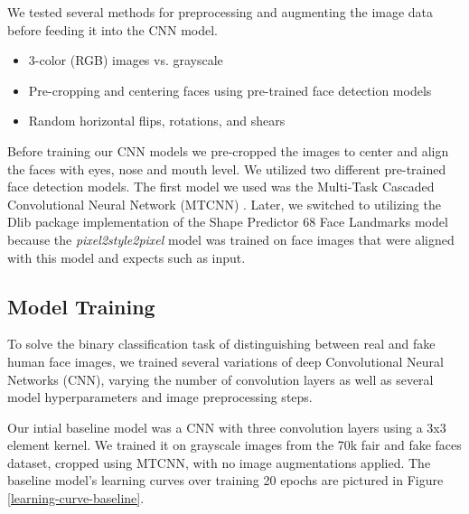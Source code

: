 \documentclass[11pt, letterpaper]{article}
\providecommand{\tightlist}{%
  \setlength{\itemsep}{0pt}\setlength{\parskip}{0pt}
}
\begin{document}
\begin{multicols}{2}
  We tested several methods for preprocessing and augmenting the image data
  before feeding it into the CNN model.

  \begin{itemize}
    \tightlist
  \item 3-color (RGB) images vs. grayscale
  \item Pre-cropping and centering faces using pre-trained face
    detection models
  \item Random horizontal flips, rotations, and shears
  \end{itemize}

  Before training our CNN models we pre-cropped the images to center
  and align the faces with eyes, nose and mouth level. We utilized two
  different pre-trained face detection models. The first model we used
  was the Multi-Task Cascaded Convolutional Neural Network (MTCNN)
  \cite{Zhang_2016}. Later, we switched to utilizing the Dlib package
  implementation of the Shape Predictor 68 Face Landmarks model
  \cite{SAGONAS20163} because the \emph{pixel2style2pixel} model was
  trained on face images that were aligned with this model and expects
  such as input.

  \subsection{Model Training}

  To solve the binary classification task of distinguishing between
  real and fake human face images, we trained several variations of
  deep Convolutional Neural Networks (CNN), varying the number of
  convolution layers as well as several model hyperparameters and
  image preprocessing steps.

  Our intial baseline model was a CNN with three convolution layers
  using a 3x3 element kernel. We trained it on grayscale images from
  the 70k fair and fake faces dataset, cropped using MTCNN, with no
  image augmentations applied. The baseline model's learning curves
  over training 20 epochs are pictured in Figure
  \ref{learning-curve-baseline}.


\end{multicols}
\end{document}
